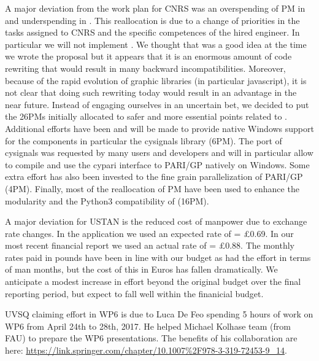 A major deviation from the work plan for CNRS was an overspending of PM in  and
underspending in . This reallocation is due to a change of priorities in the tasks
assigned to CNRS and the specific competences of the hired engineer. In particular we will
not implement . We thought that  was a good idea
at the time we wrote the proposal but it appears that it is an enormous amount of code rewriting
that would result in many backward incompatibilities. Moreover, because of the rapid
evolution of graphic libraries (in particular javascript), it is not clear that doing such
rewriting today would result in an advantage in the near future. Instead of engaging ourselves in an uncertain
bet, we decided to put the 26PMs initially allocated  to safer and more essential points related to
. Additional efforts have been and will be made to
provide native Windows support for the \ODK components in particular the cysignals
library (6PM). The port of cysignals was requested by many users and developers and will
in particular allow to compile and use the cypari interface to PARI/GP natively on Windows.
Some extra effort has also been invested to the fine grain parallelization of
PARI/GP (4PM). Finally, most of the reallocation of PM have been used to enhance
the modularity and the Python3 compatibility of \Sage (16PM).


A major deviation for USTAN is the reduced cost of manpower due to exchange rate changes. In the application
we used an expected rate of  = \pounds 0.69. In our most recent financial report we used an actual
rate of  = \pounds 0.88. The monthly rates paid in pounds have been in line with our budget as had the 
effort in terms of man months, but the cost of this in Euros has fallen dramatically. We anticipate a modest increase in 
effort beyond the original budget over the final reporting period, but expect to fall well within the finanicial budget.

UVSQ claiming effort in WP6 is due to Luca De Feo spending 5 hours of work on WP6 from April 24th to 28th, 2017. He helped Michael 
Kolhase team (from FAU) to prepare the WP6 presentations. The benefits of his collaboration are here: 
\url{https://link.springer.com/chapter/10.1007%2F978-3-319-72453-9_14}.

